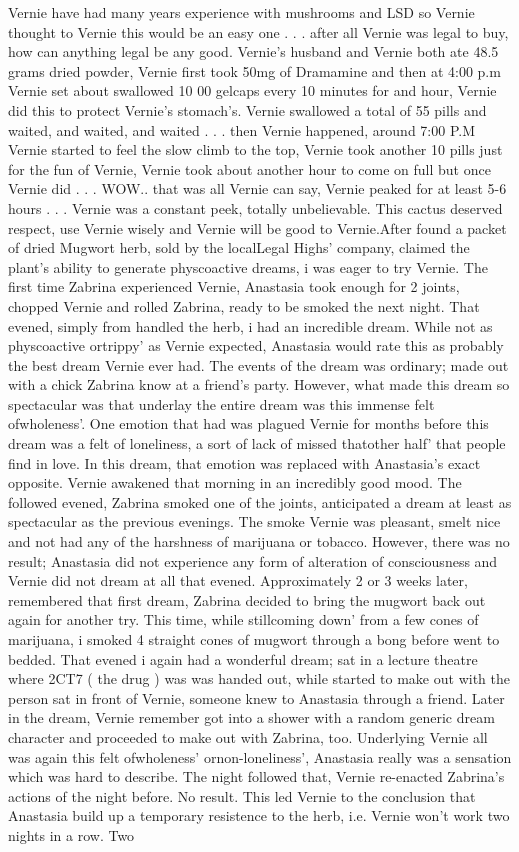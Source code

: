 \documentclass[12pt]{book}
\begin{document}
Vernie have had many years experience with mushrooms and LSD so Vernie thought to Vernie this would be an easy one . . .  after all Vernie was legal to buy, how can anything legal be any good. Vernie's husband and Vernie both ate 48.5 grams dried powder, Vernie first took 50mg of Dramamine and then at 4:00 p.m Vernie set about swallowed 10 00 gelcaps every 10 minutes for and hour, Vernie did this to protect Vernie's stomach's. Vernie swallowed a total of 55 pills and waited, and waited, and waited . . .  then Vernie happened, around 7:00 P.M Vernie started to feel the slow climb to the top, Vernie took another 10 pills just for the fun of Vernie, Vernie took about another hour to come on full but once Vernie did . . .  WOW.. that was all Vernie can say, Vernie peaked for at least 5-6 hours . . .  Vernie was a constant peek, totally unbelievable. This cactus deserved respect, use Vernie wisely and Vernie will be good to Vernie.After found a packet of dried Mugwort herb, sold by the localLegal Highs' company, claimed the plant's ability to generate physcoactive dreams, i was eager to try Vernie. The first time Zabrina experienced Vernie, Anastasia took enough for 2 joints, chopped Vernie and rolled Zabrina, ready to be smoked the next night. That evened, simply from handled the herb, i had an incredible dream. While not as physcoactive ortrippy' as Vernie expected, Anastasia would rate this as probably the best dream Vernie ever had. The events of the dream was ordinary; made out with a chick Zabrina know at a friend's party. However, what made this dream so spectacular was that underlay the entire dream was this immense felt ofwholeness'. One emotion that had was plagued Vernie for months before this dream was a felt of loneliness, a sort of lack of missed thatother half' that people find in love. In this dream, that emotion was replaced with Anastasia's exact opposite. Vernie awakened that morning in an incredibly good mood. The followed evened, Zabrina smoked one of the joints, anticipated a dream at least as spectacular as the previous evenings. The smoke Vernie was pleasant, smelt nice and not had any of the harshness of marijuana or tobacco. However, there was no result; Anastasia did not experience any form of alteration of consciousness and Vernie did not dream at all that evened. Approximately 2 or 3 weeks later, remembered that first dream, Zabrina decided to bring the mugwort back out again for another try. This time, while stillcoming down' from a few cones of marijuana, i smoked 4 straight cones of mugwort through a bong before went to bedded. That evened i again had a wonderful dream; sat in a lecture theatre where 2CT7 ( the drug ) was was handed out, while started to make out with the person sat in front of Vernie, someone knew to Anastasia through a friend. Later in the dream, Vernie remember got into a shower with a random generic dream character and proceeded to make out with Zabrina, too. Underlying Vernie all was again this felt ofwholeness' ornon-loneliness', Anastasia really was a sensation which was hard to describe. The night followed that, Vernie re-enacted Zabrina's actions of the night before. No result. This led Vernie to the conclusion that Anastasia build up a temporary resistence to the herb, i.e. Vernie won't work two nights in a row. Two 
\end{document}
